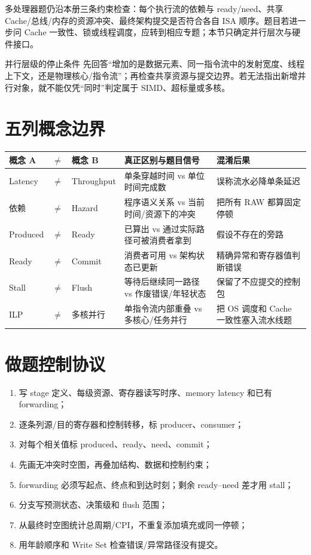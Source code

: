 \documentclass[UTF8,fontset=fandol,11pt,a4paper]{ctexart}
\begin{document}
多处理器题仍沿本册三条约束检查：每个执行流的依赖与 ready/need、共享 Cache/总线/内存的资源冲突、最终架构提交是否符合各自 ISA 顺序。题目若进一步问 Cache 一致性、锁或线程调度，应转到相应专题；本节只确定并行层次与硬件接口。

\begin{methodbox}{并行层级的停止条件}
先回答“增加的是数据元素、同一指令流中的发射宽度、线程上下文，还是物理核心/指令流”；再检查共享资源与提交边界。若无法指出新增并行对象，就不能仅凭“同时”判定属于 SIMD、超标量或多核。
\end{methodbox}

\section{五列概念边界}

\begin{center}
\small
\begin{tabularx}{\linewidth}{L{1.8cm}C{0.35cm}L{1.8cm}Y Y}
\toprule
概念 A & $\neq$ & 概念 B & 真正区别与题目信号 & 混淆后果\\
\midrule
Latency & $\neq$ & Throughput & 单条穿越时间 vs 单位时间完成数 & 误称流水必降单条延迟\\
依赖 & $\neq$ & Hazard & 程序语义关系 vs 当前时间/资源下的冲突 & 把所有 RAW 都算固定停顿\\
Produced & $\neq$ & Ready & 已算出 vs 通过实际路径可被消费者拿到 & 假设不存在的旁路\\
Ready & $\neq$ & Commit & 消费者可用 vs 架构状态已更新 & 精确异常和寄存器值判断错误\\
Stall & $\neq$ & Flush & 等待后继续同一路径 vs 作废错误/年轻状态 & 保留了不应提交的控制包\\
ILP & $\neq$ & 多核并行 & 单指令流内部重叠 vs 多核心/任务并行 & 把 OS 调度和 Cache 一致性塞入流水线题\\
\bottomrule
\end{tabularx}
\end{center}

\section{做题控制协议}

\begin{enumerate}
  \item 写 stage 定义、每级资源、寄存器读写时序、memory latency 和已有 forwarding；
  \item 逐条列源/目的寄存器和控制转移，标 producer、consumer；
  \item 对每个相关值标 produced、ready、need、commit；
  \item 先画无冲突时空图，再叠加结构、数据和控制约束；
  \item forwarding 必须写起点、终点和到达时刻；剩余 ready--need 差才用 stall；
  \item 分支写预测状态、决策级和 flush 范围；
  \item 从最终时空图统计总周期/CPI，不重复添加填充或同一停顿；
  \item 用年龄顺序和 Write Set 检查错误/异常路径没有提交。
\end{enumerate}
\end{document}
